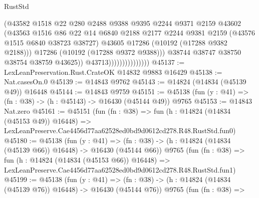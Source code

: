 \begin{lexlean}{RustStd}
\begin{coremodule}
                                      (@43582
                                        @1518
                                        @22
                                        @280
                                        @2488
                                        @9388
                                        @9395
                                        @2244
                                        @9371
                                        @2159
                                        @43602
                                        (@43563
                                          @1516
                                          @86
                                          @22
                                          @14
                                          @6840
                                          @2188
                                          @2177
                                          @2244
                                          @9381
                                          @2159
                                          (@43576 @1515 @6840 @38723 @38727)
                                          @43605
                                          @17286
                                          (@10192 (@17288 @9382 @2188)))
                                        @17286
                                        (@10192 (@17288 @9372 @9388)))
                                      @38744
                                      @38747
                                      @38750
                                      @38754
                                      @38759
                                      @43625))
                                  @43713)))))))))))))))
@45137 := LexLeanPreservation.Rust.CrateOK @14832 @9883 @16429
@45138 := Nat.casesOn.{0}
@45139 := @14843 @9762
@45143 := @14824 (@14834 (@45139 @49)) @16448
@45144 := @14843 @9759
@45151 := @45138 (fun (y : @41) => (fn : @38) -> (h : @45143) -> @16430 (@45144 @49)) @9765
@45153 := @14843 Nat.zero
@45161 := @45151
    (fun (fn : @38) =>
    fun (h : @14824 (@14834 (@45153 @49)) @16448) =>
    LexLeanPreserve.Cae4456d77aa62528ed0bd9d0612cd278.R48.RustStd.fun0)
@45180 := @45138
    (fun (y : @41) =>
    (fn : @38) -> (h : @14824 (@14834 (@45139 @66)) @16448) -> @16430 (@45144 @66))
    @9765
    (fun (fn : @38) =>
    fun (h : @14824 (@14834 (@45153 @66)) @16448) =>
    LexLeanPreserve.Cae4456d77aa62528ed0bd9d0612cd278.R48.RustStd.fun1)
@45199 := @45138
    (fun (y : @41) =>
    (fn : @38) -> (h : @14824 (@14834 (@45139 @76)) @16448) -> @16430 (@45144 @76))
    @9765
    (fun (fn : @38) =>

\end{coremodule}
\end{lexlean}
